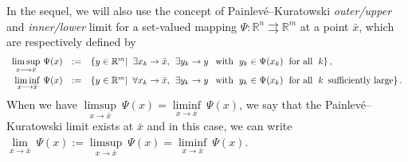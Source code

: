 In the sequel, we will also use the concept of Painlev\'{e}--Kuratowski \emph{outer/upper} and \emph{inner/lower} limit for a set-valued mapping $\Psi :\mathbb{R}^n \rightrightarrows \mathbb{R}^m$ at a point $\bar x$, which are respectively defined by
\[
\begin{array}{rcl}
\underset{x \longrightarrow \bar x}\limsup~\Psi(x) &:=& \left\{y\in \mathbb{R}^m |\;\;\exists x_k \rightarrow \bar x, \;\, \exists y_k \rightarrow y \;\,            \mbox{ with } \;y_k\-\in \Psi(x_k)\; \mbox{ for all }\; k  \right\},\\[2ex]
\underset{x \longrightarrow \bar x}\liminf~\Psi(x)&:=&\left\{y\in \mathbb{R}^m |\;\;\forall x_k   \rightarrow \bar x, \;\, \exists y_k \rightarrow y \;\,   
\mbox{ with } \;y_k\-\in \Psi(x_k)\; \mbox{ for all }\; k \, \mbox{   {sufficiently large}} \right\}.
\end{array}
\]
  {
When we have $\underset{x \longrightarrow \bar x}\limsup~\Psi(x) = \underset{x \longrightarrow \bar x}\liminf~\Psi(x)$, we say that the Painlev\'{e}--Kuratowski limit  exists at $\bar x$ and in this case, we can write $\underset{x \longrightarrow \bar x}\lim~\Psi(x) :=\underset{x \longrightarrow \bar x}\limsup~\Psi(x) = \underset{x \longrightarrow \bar x}\liminf~\Psi(x)$.}


